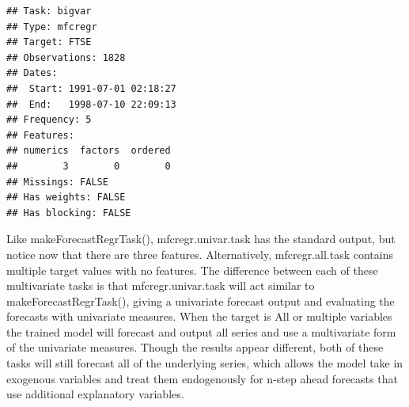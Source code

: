 \documentclass[12pt]{article}%
\makeatletter
\theoremstyle{definition}
\newcommand\code{\@codex}
\def\@codex#1{{\normalfont\ttfamily\hyphenchar\font=-1 #1}}
\makeatother
\begin{document}
\singlespacing
\begin{knitrout}
\color{fgcolor}\begin{kframe}
\begin{alltt}
 \hlkwb{=} \hlstd{(} \hlstd{=} \hlstd{,}
                                          
                                          \hlstd{=} \hlstd{,}
                                          \hlstd{=} \hlstd{)}
\end{alltt}
\begin{verbatim}
## Task: bigvar
## Type: mfcregr
## Target: FTSE
## Observations: 1828
## Dates:
##  Start: 1991-07-01 02:18:27 
##  End:   1998-07-10 22:09:13
## Frequency: 5
## Features:
## numerics  factors  ordered 
##        3        0        0 
## Missings: FALSE
## Has weights: FALSE
## Has blocking: FALSE
\end{verbatim}
\end{kframe}
\end{knitrout}
\doublespacing

Like \code{makeForecastRegrTask()}, \code{mfcregr.univar.task} has the standard output, but notice now that there are three features. Alternatively, \code{mfcregr.all.task} contains multiple target values with no features. The difference between each of these multivariate tasks is that \code{mfcregr.univar.task} will act similar to \code{makeForecastRegrTask()}, giving a univariate forecast output and evaluating the forecasts with univariate measures. When the target is \code{All} or multiple variables the trained model will forecast and output all series and use a multivariate form of the univariate measures. Though the results appear different, both of these tasks will still forecast all of the underlying series, which allows the model take in exogenous variables and treat them endogenously for n-step ahead forecasts that use additional explanatory variables.
\end{document}
